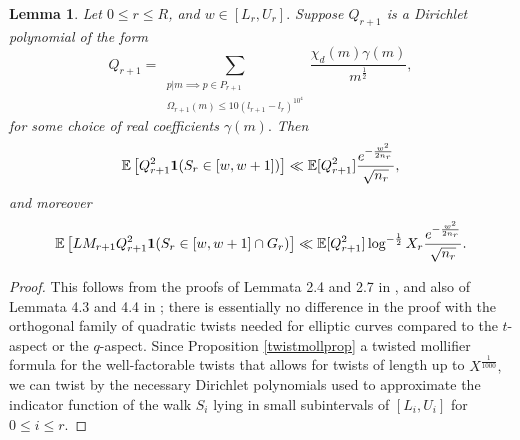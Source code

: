 \documentclass[12pt]{amsart}
\def\E{\ensuremath\mathbb{E}}
\numberwithin{equation}{section}
\newtheorem{lem}[thm]{Lemma}
\numberwithin{thm}{section}
\newcommand{\1}{\mathbf 1}
\begin{document}
\begin{lem}\label{pointmom}
	Let $0\le r\le R$, and $w\in [L_r,U_r].$ Suppose $Q_{r+1}$ is a Dirichlet polynomial of the form
	\begin{equation}
		Q_{r+1}=\sum_{\substack{p|m \implies p\in P_{r+1}\\ \Omega_{r+1}(m)\le 10(l_{r+1}-l_{r})^{10^4}}}\frac{\chi_d(m)\gamma(m)}{m^{\frac{1}{2}}},
	\end{equation}
	for some choice of real coefficients $\gamma(m).$
	Then \begin{equation}\label{2.4}
		\E\left[Q_{r+1}^2\mathbf{1}(S_{r}\in [w,w+1])\right]\ll \E[Q_{r+1}^2] \frac{e^{-\frac{w^2}{2n_r}}}{\sqrt{n_r}},
	\end{equation}
	and moreover
	\begin{equation}\label{2.7}
		\E\left[LM_{r+1}Q_{r+1}^2\mathbf{1}(S_{r}\in [w,w+1]\cap G_r)\right]\ll \E[Q_{r+1}^2] \log^{-\frac{1}{2}}X_{r}\frac{e^{-\frac{w^2}{2n_r}}}{\sqrt{n_r}}.
	\end{equation}
\end{lem}
\begin{proof}
	This follows from the proofs of Lemmata 2.4 and 2.7 in \cite{AB}, and also of Lemmata 4.3 and 4.4 in \cite{AC25}; there is essentially no difference in the proof with the orthogonal family of quadratic twists needed for elliptic curves compared to the $t$-aspect or the $q$-aspect. Since Proposition \ref{twistmollprop} a twisted mollifier formula for the well-factorable twists that allows for twists of length up to $X^{\frac{1}{1000}},$ we can twist by the necessary Dirichlet polynomials used to approximate the indicator function of the walk $S_{i}$ lying in small subintervals of $[L_i,U_i]$ for $0\le i\le r.$
\end{proof}		
\end{document}
